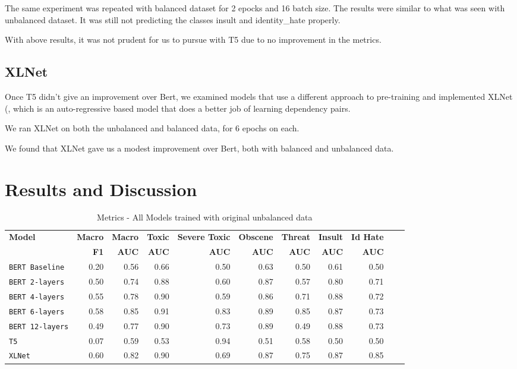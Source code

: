 \documentclass[11pt,a4paper]{article}
\begin{document}
The same experiment was repeated with balanced dataset for 2 epocks and 16 batch size. The results were similar to what was seen with unbalanced dataset. It was still not predicting the classes insult and identity\_hate properly.

With above results, it was not prudent for us to pursue with T5 due to no improvement in the metrics.

\subsection{XLNet}

Once T5 didn't give an improvement over Bert, we examined models that use a different approach to pre-training and implemented XLNet (\cite{yang2019xlnet}, which is an auto-regressive based model that does a better job of learning dependency pairs.

We ran XLNet on both the unbalanced and balanced data, for 6 epochs on each.

We found that XLNet gave us a modest improvement over Bert, both with balanced and unbalanced data.

\FloatBarrier
\section{Results and Discussion}

\begin{table}

\centering
\begin{tabular}{lrrrrrrrrrr}
\hline
\textbf{Model} & \textbf{Macro} & \textbf{Macro} & \textbf{Toxic} & \textbf{Severe Toxic} & \textbf{Obscene} & \textbf{Threat} & \textbf{Insult} & \textbf{Id Hate}
\\
\textbf{ } & \textbf{F1} & \textbf{AUC} & \textbf{AUC} & \textbf{AUC} & \textbf{AUC} & \textbf{AUC} & \textbf{AUC} & \textbf{AUC}\\
\hline
\verb|BERT Baseline|&0.20 & 0.56 & 0.66 & 0.50 & 0.63 & 0.50 & 0.61 & 0.50 \\
\verb|BERT 2-layers| & 0.50 & 0.74 & 0.88 & 0.60 & 0.87 & 0.57 & 0.80 & 0.71 \\
\verb|BERT 4-layers| & 0.55 & 0.78 & 0.90 & 0.59 & 0.86 & 0.71 & 0.88 & 0.72 \\
\verb|BERT 6-layers| & 0.58 & 0.85 & 0.91 & 0.83 & 0.89 & 0.85 & 0.87 & 0.73 \\
\verb|BERT 12-layers| & 0.49 & 0.77 & 0.90 & 0.73 & 0.89 & 0.49 & 0.88 & 0.73 \\
\verb|T5| & 0.07 & 0.59 & 0.53 & 0.94 & 0.51 & 0.58 & 0.50 & 0.50 \\
\verb|XLNet| & 0.60 & 0.82 & 0.90 & 0.69 & 0.87 & 0.75 & 0.87 & 0.85 \\
\hline
\end{tabular}
\caption{Metrics - All Models trained with original unbalanced data}
\label{table:UnBalResults}
\end{table}
\end{document}

